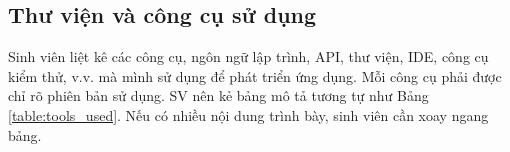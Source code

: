 \documentclass[../DoAn.tex]{subfiles}
\begin{document}
\subsection{Thư viện và công cụ sử dụng}
Sinh viên liệt kê các công cụ, ngôn ngữ lập trình, API, thư viện, IDE, công cụ kiểm thử, v.v. mà mình sử dụng để phát triển ứng dụng. Mỗi công cụ phải được chỉ rõ phiên bản sử dụng. SV nên kẻ bảng mô tả tương tự như Bảng \ref{table:tools_used}. Nếu có nhiều nội dung trình bày, sinh viên cần xoay ngang bảng.
\end{document}
